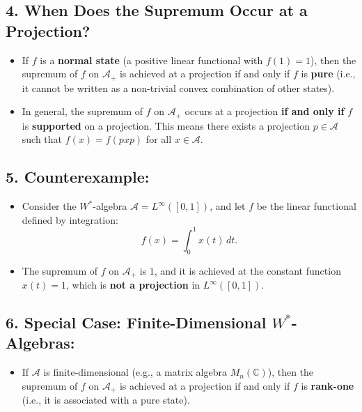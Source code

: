 \documentclass{article}
\begin{document}
\begin{itemize}
\subsection*{4. When Does the Supremum Occur at a Projection?}
\begin{itemize}
    \item If \( f \) is a \textbf{normal state} (a positive linear functional with \( f(1) = 1 \)), then the supremum of \( f \) on \( \mathcal{A}_+ \) is achieved at a projection if and only if \( f \) is \textbf{pure} (i.e., it cannot be written as a non-trivial convex combination of other states).
    \item In general, the supremum of \( f \) on \( \mathcal{A}_+ \) occurs at a projection \textbf{if and only if} \( f \) is \textbf{supported} on a projection. This means there exists a projection \( p \in \mathcal{A} \) such that \( f(x) = f(pxp) \) for all \( x \in \mathcal{A} \).
\end{itemize}

\subsection*{5. Counterexample:}
\begin{itemize}
    \item Consider the \( W^* \)-algebra \( \mathcal{A} = L^\infty([0, 1]) \), and let \( f \) be the linear functional defined by integration:
    \[
    f(x) = \int_0^1 x(t) \, dt.
    \]
    \item The supremum of \( f \) on \( \mathcal{A}_+ \) is \( 1 \), and it is achieved at the constant function \( x(t) = 1 \), which is \textbf{not a projection} in \( L^\infty([0, 1]) \).
\end{itemize}

\subsection*{6. Special Case: Finite-Dimensional \( W^* \)-Algebras:}
\begin{itemize}
    \item If \( \mathcal{A} \) is finite-dimensional (e.g., a matrix algebra \( M_n(\mathbb{C}) \)), then the supremum of \( f \) on \( \mathcal{A}_+ \) is achieved at a projection if and only if \( f \) is \textbf{rank-one} (i.e., it is associated with a pure state).
\end{itemize}


\end{itemize}
\end{document}
